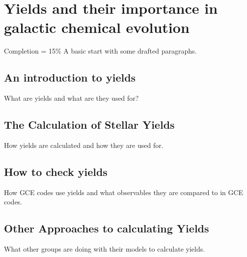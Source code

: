 \chapter{Yields and their importance in galactic chemical evolution}

Completion = 15\%
A basic start with some drafted paragraphs.

\section{An introduction to yields}

What are yields and what are they used for?

\section{The Calculation of Stellar Yields}

How yields are calculated and how they are used for.

\section{How to check yields}

How GCE codes use yields and what observables they are compared to in GCE codes.

\section{Other Approaches to calculating Yields}

What other groups are doing with their models to calculate yields.
